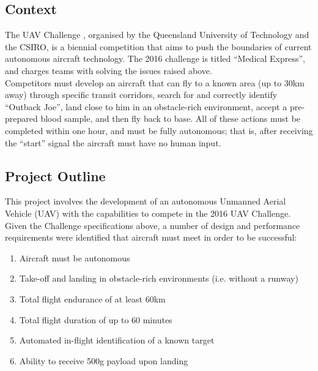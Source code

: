 
\subsection{Context}
The UAV Challenge \cite{ref:challenge}, organised by the Queensland University of Technology and the CSIRO, is a biennial competition that aims to push the boundaries of current autonomous aircraft technology. The 2016 challenge is titled ``Medical Express'', and charges teams with solving the issues raised above.\\

Competitors must develop an aircraft that can fly to a known area (up to 30km away) through specific transit corridors, search for and correctly identify ``Outback Joe'', land close to him in an obstacle-rich environment, accept a pre-prepared blood sample, and then fly back to base. All of these actions must be completed within one hour, and must be fully autonomous; that is, after receiving the ``start'' signal the aircraft must have no human input.

\subsection{Project Outline}
This project involves the development of an autonomous Unmanned Aerial Vehicle (UAV) with the capabilities to compete in the 2016 UAV Challenge. Given the Challenge specifications above, a number of design and performance requirements were identified that aircraft must meet in order to be successful:
\begin{enumerate}[label=\bfseries R\arabic*:] \itemsep-2pt
	\item Aircraft must be autonomous
	\item Take-off and landing in obstacle-rich environments (i.e. without a runway)
	\item Total flight endurance of at least 60km
	\item Total flight duration of up to 60 minutes
	\item Automated in-flight identification of a known target
	\item Ability to receive 500g payload upon landing
\end{enumerate}

